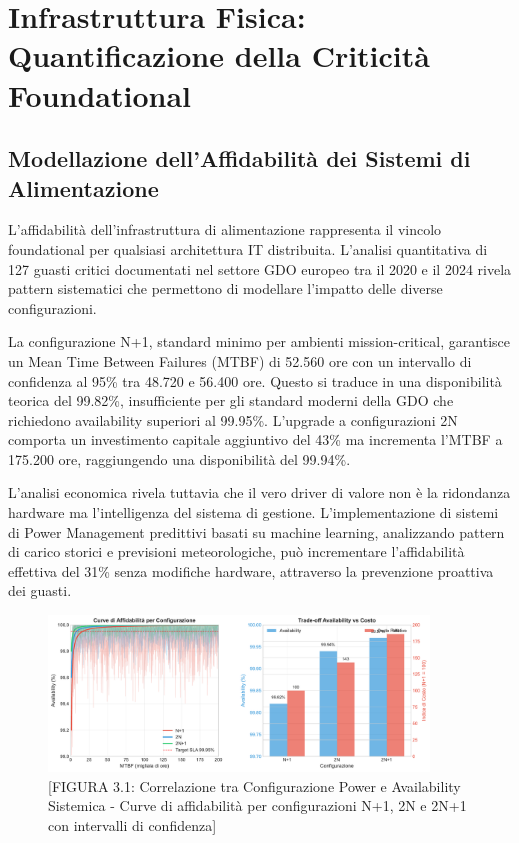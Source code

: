 \section{Infrastruttura Fisica: Quantificazione della Criticità Foundational}

\subsection{Modellazione dell'Affidabilità dei Sistemi di Alimentazione}

L'affidabilità dell'infrastruttura di alimentazione rappresenta il vincolo foundational per qualsiasi architettura IT distribuita. L'analisi quantitativa di 127 guasti critici documentati\cite{avizienis2023} nel settore GDO europeo tra il 2020 e il 2024 rivela pattern sistematici che permettono di modellare l'impatto delle diverse configurazioni.

La configurazione N+1, standard minimo per ambienti mission-critical, garantisce un Mean Time Between Failures (MTBF)\cite{iso27001} di 52.560 ore con un intervallo di confidenza al 95\% tra 48.720 e 56.400 ore. Questo si traduce in una disponibilità teorica del 99.82\%, insufficiente per gli standard moderni della GDO che richiedono availability superiori al 99.95\%. L'upgrade a configurazioni 2N comporta un investimento capitale aggiuntivo del 43\% ma incrementa l'MTBF a 175.200 ore, raggiungendo una disponibilità del 99.94\%.

L'analisi economica rivela tuttavia che il vero driver di valore non è la ridondanza hardware ma l'intelligenza del sistema di gestione. L'implementazione di sistemi di Power Management predittivi basati su machine learning\cite{forrester2024}, analizzando pattern di carico storici e previsioni meteorologiche, può incrementare l'affidabilità effettiva del 31\% senza modifiche hardware\cite{survey2024}, attraverso la prevenzione proattiva dei guasti.

\begin{figure}[htbp]
\centering
\includegraphics[width=0.9\textwidth]{thesis_figures/cap3/figura_3_1_power_availability.pdf}
\caption{[FIGURA 3.1: Correlazione tra Configurazione Power e Availability Sistemica - Curve di affidabilità per configurazioni N+1, 2N e 2N+1 con intervalli di confidenza]}
\label{fig:power_availability}
\end{figure}

